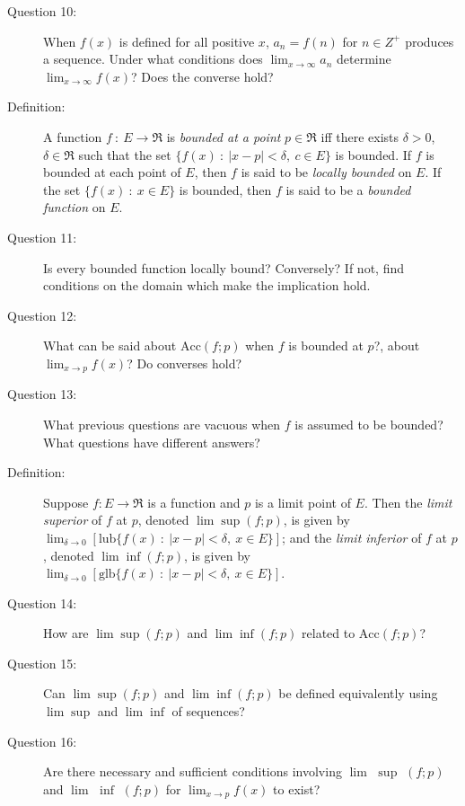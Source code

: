 \documentclass{article}
\begin{document}
\begin{description}
  \item[Question 10:] When $f(x)$ is defined for all positive $x$, $a_n = f(n)$ for $n \in Z^+$ produces a sequence. Under what conditions does $\displaystyle \lim_{x \to \infty} a_n$ determine $\displaystyle \lim_{x \to \infty} f(x)$? Does the converse hold?

  \item[Definition:] A function $f\ :\ E \to \Re$ is \emph{bounded at a point} $p \in \Re$ iff there exists $\delta > 0$, $\delta \in \Re$ such that the set $\{ f(x)\ :\ |x-p| < \delta,\ c \in E \}$ is bounded. If $f$ is bounded at each point of $E$, then $f$ is said to be \emph{locally bounded} on $E$. If the set $\{ f(x)\ :\ x \in E \}$ is bounded, then $f$ is said to be a \emph{bounded function} on $E$.

  \item[Question 11:] Is every bounded function locally bound? Conversely? If not, find conditions on the domain which make the implication hold.

  \item[Question 12:] What can be said about $\text{Acc} (f;p)$ when $f$ is bounded at $p$?, about $\displaystyle \lim_{x \to p} f(x)$? Do converses hold?

  \item[Question 13:] What previous questions are vacuous when $f$ is assumed to be bounded? What questions have different answers?

  \item[Definition:] Suppose $f: E \to \Re$ is a function and $p$ is a limit point of $E$. Then the \emph{limit superior} of $f$ at $p$, denoted $\lim \sup (f;p)$, is given by $\displaystyle \lim_{\delta \to 0} [\text{lub} \{ f(x)\ :\ |x-p| < \delta,\ x \in E \}]$; and the \emph{limit inferior} of $f$ at $p$, denoted $\lim \inf (f;p)$, is given by $\displaystyle \lim_{\delta \to 0} [\text{glb} \{ f(x)\ :\ |x-p| < \delta,\ x \in E \}]$.

  \item[Question 14:] How are $\lim \sup (f;p)$ and $\lim \inf (f;p)$ related to $\text{Acc} (f;p)$?

  \item[Question 15:] Can $\lim \sup (f;p)$ and $\lim \inf (f;p)$ be defined equivalently using $\lim \sup$ and $\lim \inf$ of sequences?

  \item[Question 16:] Are there necessary and sufficient conditions involving $\lim$ $\sup$ $(f;p)$ and $\lim$ $\inf$ $(f;p)$ for $\displaystyle \lim_{x \to p} f(x)$ to exist?


\end{description}
\end{document}
